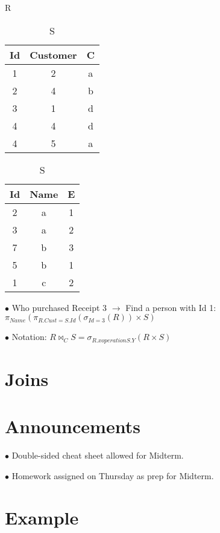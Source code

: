 \documentclass[twoside]{article}
\begin{document}
\begin{table}[!htb]
    \begin{minipage}{.5\linewidth}
      \caption{R}
      \centering
        \begin{tabular}{c|c|c}
            Id & Customer & C \\
            \hline
            1 & 2 & a \\
            2 & 4 & b \\
            3 & 1 & d \\
            4 & 4 & d \\
            4 & 5 & a \\
        \end{tabular}
    \end{minipage}
    \begin{minipage}{.25\linewidth}
      \centering
        \caption{S}
        \begin{tabular}{c|c|c}
            Id & Name & E \\
            \hline
            2 & a & 1 \\
            3 & a & 2 \\
            7 & b & 3 \\
            5 & b & 1 \\
            1 & c & 2 \\
        \end{tabular}
    \end{minipage} 
\end{table}

$\bullet$ Who purchased Receipt 3 $\longrightarrow$ Find a person with Id 1: $
\pi_{Name}(\pi_{R.Cust=S.Id}(\sigma_{Id=3}(R))\times S)$

$\bullet$ Notation: $R \bowtie_{C} S = \sigma_{R.x operation S.Y}(R \times S)$

\newpage
\section{Joins}

\section*{Announcements}
$\bullet$ Double-sided cheat sheet allowed for Midterm.

$\bullet$ Homework assigned on Thursday as prep for Midterm.

\section*{Example}
\end{document}
